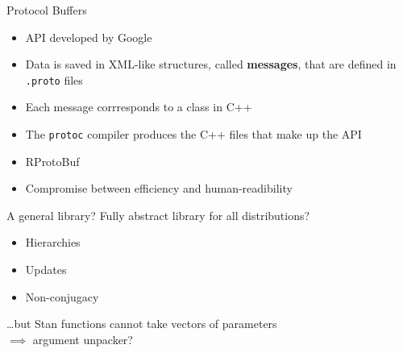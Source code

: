 \begin{frame}{Protocol Buffers}
	\begin{itemize}
		\item API developed by Google
		\item Data is saved in XML-like structures, called \textbf{messages}, that are defined in \texttt{.proto} files
		\item Each message corrresponds to a class in C++
		\item The \texttt{protoc} compiler produces the C++ files that make up the API
		\item RProtoBuf
		\item Compromise between efficiency and human-readibility
	\end{itemize}
\end{frame}

\begin{frame}{A general library?}
	Fully abstract library for all distributions?
	\begin{itemize}
		\item Hierarchies
		\item Updates
		\item Non-conjugacy
	\end{itemize}
	\vspace{10pt}
	\dots but Stan functions cannot take vectors of parameters \\
	$\implies$ argument unpacker?
\end{frame}


